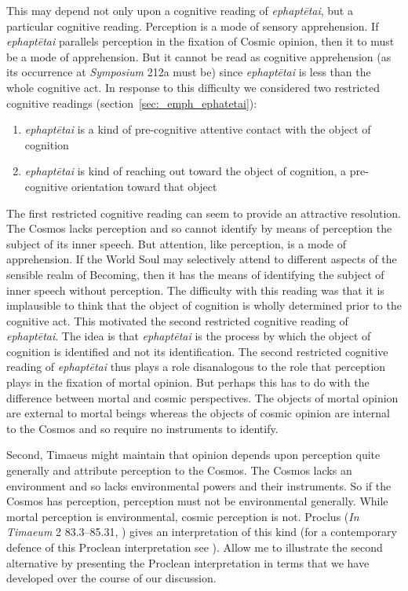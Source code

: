 This may depend not only upon a cognitive reading of \emph{ephaptētai}, but a particular cognitive reading. Perception is a mode of sensory apprehension. If \emph{ephaptētai} parallels perception in the fixation of Cosmic opinion, then it to must be a mode of apprehension. But it cannot be read as cognitive apprehension (as its occurrence at \emph{Symposium} 212a must be) since \emph{ephaptētai} is less than the whole cognitive act. In response to this difficulty we considered two restricted cognitive readings (section~\ref{sec:_emph_ephatetai}):
\begin{enumerate}[(1)]
	\item \emph{ephaptētai} is a kind of pre-cognitive attentive contact with the object of cognition
	\item \emph{ephaptētai} is kind of reaching out toward the object of cognition, a pre-cognitive orientation toward that object
\end{enumerate}
The first restricted cognitive reading can seem to provide an attractive resolution. The Cosmos lacks perception and so cannot identify by means of perception the subject of its inner speech. But attention, like perception, is a mode of apprehension. If the World Soul may selectively attend to different aspects of the sensible realm of Becoming, then it has the means of identifying the subject of inner speech without perception. The difficulty with this reading was that it is implausible to think that the object of cognition is wholly determined prior to the cognitive act. This motivated the second restricted cognitive reading of \emph{ephaptētai}. The idea is that \emph{ephaptētai} is the process by which the object of cognition is identified and not its identification. The second restricted cognitive reading of \emph{ephaptētai} thus plays a role disanalogous to the role that perception plays in the fixation of mortal opinion. But perhaps this has to do with the difference between mortal and cosmic perspectives. The objects of mortal opinion are external to mortal beings whereas the objects of cosmic opinion are internal to the Cosmos and so require no instruments to identify. 

Second, Timaeus might maintain that opinion depends upon perception quite generally and attribute perception to the Cosmos. The Cosmos lacks an environment and so lacks environmental powers and their instruments. So if the Cosmos has perception, perception must not be environmental generally. While mortal perception is environmental, cosmic perception is not. Proclus (\emph{In Timaeum} 2 83.3–85.31, \citealt{Diehl:1903re}) gives an interpretation of this kind (for a contemporary defence of this Proclean interpretation see \citealt{Reydams-Schils:1997aa}). Allow me to illustrate the second alternative by presenting the Proclean interpretation in terms that we have developed over the course of our discussion.

